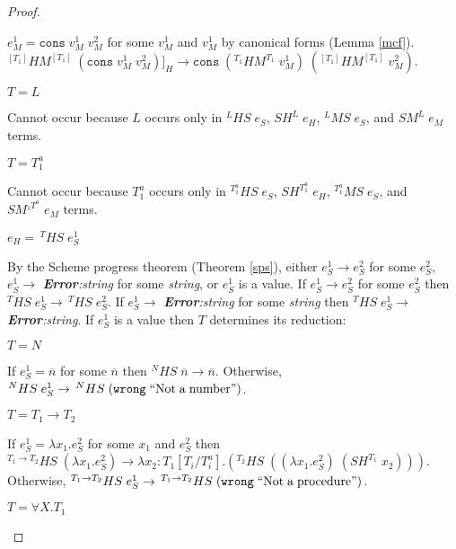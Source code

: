 \begin{hps}
\begin{proof}
\begin{hps-case-13}
\begin{hps-case-13-4}
$e_{M}^{1}=\mathtt{cons}\;v_{M}^{1}\;v_{M}^{2}$ for some $v_{M}^{1}$ and $v_{M}^{1}$ by canonical forms (Lemma \ref{mcf}).  $^{[T_{1}]}HM^{[T_{1}]}\;(\mathtt{cons}\;v_{M}^{1}\;v_{M}^{2})]_{H}\rightarrow\mathtt{cons}\;(^{T_{1}}HM^{T_{1}}\;v_{M}^{1})\;(^{[T_{1}]}HM^{[T_{1}]}\;v_{M}^{2})$.
\end{hps-case-13-4}
\begin{hps-case-13-5}
$T=L$

Cannot occur because $L$ occurs only in $^{L}HS\;e_{S}$, $SH^{L}\;e_{H}$, $^{L}MS\;e_{S}$, and $SM^{L}\;e_{M}$ terms.
\end{hps-case-13-5}
\begin{hps-case-13-6}
$T=T_{1}^{a}$

Cannot occur because $T_{1}^{a}$ occurs only in $^{T_{1}^{a}}HS\;e_{S}$, $SH^{T_{1}^{a}}\;e_{H}$, $^{T_{1}^{a}}MS\;e_{S}$, and $SM^{_{1}T^{a}}\;e_{M}$ terms.
\end{hps-case-13-6}
\end{hps-case-13}
\begin{hps-case-14}
$e_{H}=\,^{T}HS\;e_{S}^{1}$

By the Scheme progress theorem (Theorem \ref{sps}), either $e_{S}^{1}\rightarrow e_{S}^{2}$ for some $e_{S}^{2}$, $e_{S}^{1}\rightarrow$ \emph{\textbf{Error}:\;string} for some \emph{string}, or $e_{S}^{1}$ is a value.  If $e_{S}^{1}\rightarrow e_{S}^{2}$ for some $e_{S}^{2}$ then $^{T}HS\;e_{S}^{1}\rightarrow\,^{T}HS\;e_{S}^{2}$.  If $e_{S}^{1}\rightarrow$ \emph{\textbf{Error}:\;string} for some \emph{string} then $^{T}HS\;e_{S}^{1}\rightarrow$ \emph{\textbf{Error}:\;string}.  If $e_{S}^{1}$ is a value then $T$ determines its reduction:
\begin{hps-case-14-1}
$T=N$

If $e_{S}^{1}=\overline{n}$ for some $\overline{n}$ then $^{N}HS\;\overline{n}\rightarrow\overline{n}$.  Otherwise, $^{N}HS\;e_{S}^{1}\rightarrow\,^{N}HS\;(\mathtt{wrong}\;\mathrm{``Not\;a\;number"})$.
\end{hps-case-14-1}
\begin{hps-case-14-2}
$T=T_{1}\rightarrow T_{2}$

If $e_{S}^{1}=\lambda x_{1}.e_{S}^{2}$ for some $x_{1}$ and $e_{S}^{2}$ then $^{T_{1}\rightarrow T_{2}}HS\;(\lambda x_{1}.e_{S}^{2})\rightarrow\lambda x_{2}:T_{1}[T_{i}/T^{a}_{i}].(^{T_{2}}HS\;((\lambda x_{1}.e_{S}^{2})\;(SH^{T_{1}}\;x_{2})))$.  Otherwise, $^{T_{1}\rightarrow T_{2}}HS\;e_{S}^{1}\rightarrow\,^{T_{1}\rightarrow T_{2}}HS\;(\mathtt{wrong}\;\mathrm{``Not\;a\;procedure"})$.
\end{hps-case-14-2}
\begin{hps-case-14-3}
$T=\forall X.T_{1}$


\end{hps-case-14-3}
\end{hps-case-14}
\end{proof}
\end{hps}
